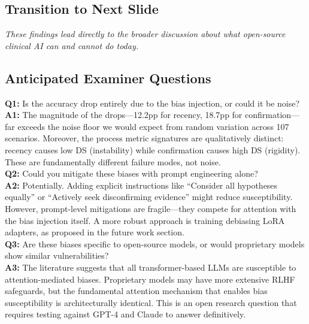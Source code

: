 \documentclass[12pt]{article}
\begin{document}
  \subsection*{Transition to Next Slide}
  {\color{transgreen}
  \textit{These findings lead directly to the broader discussion about what open-source clinical AI can and cannot do today.}
  }

  \subsection*{Anticipated Examiner Questions}
  \begin{qabox}
  \textbf{Q1:} Is the accuracy drop entirely due to the bias injection, or could it be noise? \\
  \textbf{A1:} The magnitude of the drops---12.2pp for recency, 18.7pp for confirmation---far exceeds the noise floor we would expect from random variation across 107 scenarios. Moreover, the process metric signatures are qualitatively distinct: recency causes low DS (instability) while confirmation causes high DS (rigidity). These are fundamentally different failure modes, not noise. \\[6pt]
  \textbf{Q2:} Could you mitigate these biases with prompt engineering alone? \\
  \textbf{A2:} Potentially. Adding explicit instructions like ``Consider all hypotheses equally'' or ``Actively seek disconfirming evidence'' might reduce susceptibility. However, prompt-level mitigations are fragile---they compete for attention with the bias injection itself. A more robust approach is training debiasing LoRA adapters, as proposed in the future work section. \\[6pt]
  \textbf{Q3:} Are these biases specific to open-source models, or would proprietary models show similar vulnerabilities? \\
  \textbf{A3:} The literature suggests that all transformer-based LLMs are susceptible to attention-mediated biases. Proprietary models may have more extensive RLHF safeguards, but the fundamental attention mechanism that enables bias susceptibility is architecturally identical. This is an open research question that requires testing against GPT-4 and Claude to answer definitively.
  \end{qabox}



\end{document}
